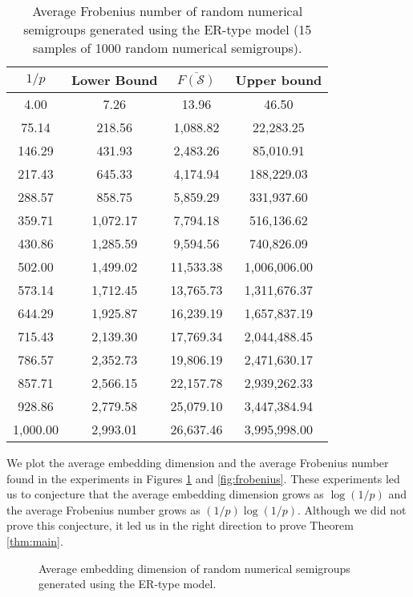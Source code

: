 \begin{table}
\centering
\begin{tabular}{|c|c|c|c|}
    \hline
    $1/p$ & Lower Bound & $\overline{F(\mathcal{S})}$ & Upper bound \\
    \hline
    4.00 & 7.26 & 13.96 & 46.50 \\
    75.14 & 218.56 & 1,088.82 & 22,283.25 \\
    146.29 & 431.93 & 2,483.26 & 85,010.91 \\
    217.43 & 645.33 & 4,174.94 & 188,229.03 \\
    288.57 & 858.75 & 5,859.29 & 331,937.60 \\
    359.71 & 1,072.17 & 7,794.18 & 516,136.62 \\
    430.86 & 1,285.59 & 9,594.56 & 740,826.09 \\
    502.00 & 1,499.02 & 11,533.38 & 1,006,006.00 \\
    573.14 & 1,712.45 & 13,765.73 & 1,311,676.37 \\
    644.29 & 1,925.87 & 16,239.19 & 1,657,837.19 \\
    715.43 & 2,139.30 & 17,769.34 & 2,044,488.45 \\
    786.57 & 2,352.73 & 19,806.19 & 2,471,630.17 \\
    857.71 & 2,566.15 & 22,157.78 & 2,939,262.33 \\
    928.86 & 2,779.58 & 25,079.10 & 3,447,384.94 \\
    1,000.00 & 2,993.01 & 26,637.46 & 3,995,998.00 \\
    \hline
\end{tabular}
\caption{Average Frobenius number of random numerical semigroups generated using the ER-type model (15 samples of 1000 random numerical semigroups).}
\label{tab:frobenius}
\end{table}

\newpage

We plot the average embedding dimension and the average Frobenius number found in the experiments in Figures \ref{fig:embedding} and \ref{fig:frobenius}. These experiments led us to conjecture that the average embedding dimension grows as $\log(1/p)$ and the average Frobenius number grows as $(1/p)\log(1/p)$. Although we did not prove this conjecture, it led us in the right direction to prove Theorem \ref{thm:main}. \par


\begin{figure}[h]
    \begin{center}
        
    \end{center}
    \caption{Average embedding dimension of random numerical semigroups generated using the ER-type model.}
    \label{fig:embedding}
\end{figure}

